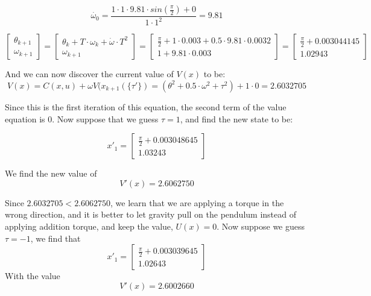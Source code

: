 \documentclass[12pt]{report}
\begin{document}
\begin{equation} 
\dot{\omega_0} = \frac{1 \cdot 1 \cdot 9.81 \cdot sin(\frac{\pi}{2})+0}{1 \cdot 1^2} = 9.81
\end{equation}

\begin{equation} 
\begin{bmatrix}
\theta_{k+1} \\
\omega_{k+1}
\end{bmatrix}
=
\begin{bmatrix}
\theta_{k} + T \cdot \omega_{k} + \dot{\omega} \cdot T^2 \\
\omega_{k+1}
\end{bmatrix}
=
\begin{bmatrix}
\frac{\pi}{2}+1 \cdot 0.003 + 0.5 \cdot 9.81 \cdot 0.0032 \\
1 + 9.81 \cdot 0.003
\end{bmatrix}
=
\begin{bmatrix}
\frac{\pi}{2}+0.003044145 \\
1.02943
\end{bmatrix}
\end{equation}

And we can now discover the current value of $V(x)$ to be:
\begin{equation} 
V(x) = C(x,u) + \omega V(x_{k+1}(\{\tau'\})=(\theta^2+0.5 \cdot \omega^2 + \tau^2)+1 \cdot 0 = 2.6032705
\end{equation}

Since this is the first iteration of this equation, the second term of the value equation is 0. Now suppose that we guess $\tau=1$, and find the new state to be:


\begin{equation} 
{x'}_1 = 
\begin{bmatrix}
\frac{\pi}{2} + 0.003048645 \\
1.03243
\end{bmatrix}
\end{equation}

We find the new value of
\begin{equation} 
V'(x) = 2.6062750
\end{equation}

Since $2.6032705 < 2.6062750$, we learn that we are applying a torque in the wrong direction, and it is better to let gravity pull on the pendulum instead of applying addition torque, and keep the value, $U(x)={0}$. Now suppose we guess $\tau = -1$, we find that 
\begin{equation} 
{x'}_1 = 
\begin{bmatrix}
\frac{\pi}{2} + 0.003039645 \\
1.02643
\end{bmatrix}
\end{equation}
With the value
\begin{equation} 
V'(x) = 2.6002660
\end{equation}
\end{document}
